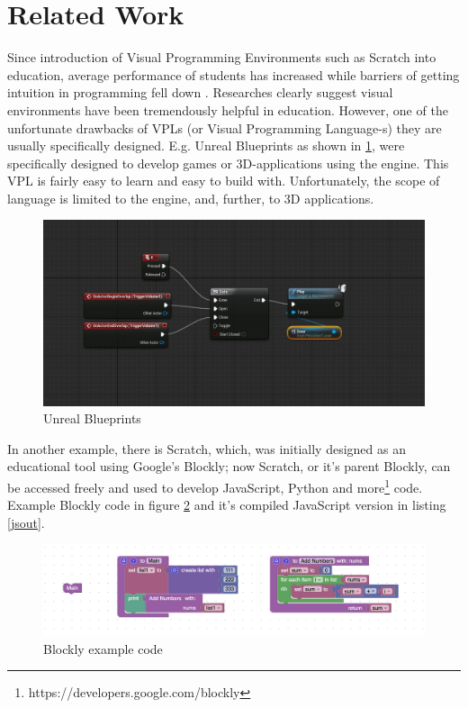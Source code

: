 \documentclass{article}
\begin{document}
\section{Related Work}
Since introduction of Visual Programming Environments such as Scratch into education, average performance of students has increased \citep{tsai_2019_improving} while barriers of getting intuition in programming fell down \citep{kelleher_2005_lowering}. Researches \citep{7318200,tsai_2019_improving,kelleher_2005_lowering} clearly suggest visual environments have been tremendously helpful in education.
However, one of the unfortunate drawbacks of VPLs (or Visual Programming Language-s) they are usually specifically designed.
E.g. Unreal Blueprints as shown in \ref{fig:blueprints}, were specifically designed to develop games or 3D-applications using the engine. This VPL is fairly easy to learn and easy to build with. Unfortunately, the scope of language is limited to the engine, and, further, to 3D applications. 

\begin{figure}[H]
\centering
\includegraphics[width=1\textwidth]{0bfef1e3868153cc4b49a3dac0214b0d.jpg}
\caption{Unreal Blueprints}
\label{fig:blueprints}
\end{figure}

In another example, there is Scratch, which, was initially designed as an educational tool using Google's Blockly; now Scratch, or it's parent Blockly, can be accessed freely and used to develop JavaScript, Python and more\footnote{https://developers.google.com/blockly} code. Example Blockly code in figure \ref{fig:blockly} and it's compiled JavaScript version in listing \ref{jsout}.

\begin{figure}[H]
  \centering
  \includegraphics[width=1\textwidth]{Screenshot 2021-05-21 at 05.08.44.png}
  \caption{Blockly example code}
  \label{fig:blockly}
  \end{figure}
\end{document}
